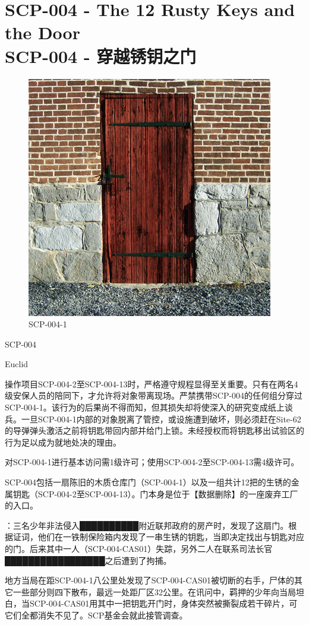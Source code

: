 \chapter[SCP-004 穿越锈钥之门]{
	SCP-004 - The 12 Rusty Keys and the Door\\
	SCP-004 - 穿越锈钥之门
}

\label{chap:SCP-004}

\begin{figure}[H]
	\centering
	\includegraphics[width=0.5\linewidth]{images/SCP.004.jpg}
	\caption*{SCP-004-1}
\end{figure}

SCP-004

Euclid

操作项目SCP-004-2至SCP-004-13时，严格遵守规程显得至关重要。只有在两名4级安保人员的陪同下，才允许将对象带离现场。严禁携带SCP-004的任何组分穿过SCP-004-1。该行为的后果尚不得而知，但其损失却将使深入的研究变成纸上谈兵。一旦SCP-004-1内部的对象脱离了管控，或设施遭到破坏，则必须赶在Site-62的导弹弹头激活之前将钥匙带回内部并给门上锁。未经授权而将钥匙移出试验区的行为足以成为就地处决的理由。

对SCP-004-1进行基本访问需1级许可；使用SCP-004-2至SCP-004-13需4级许可。

SCP-004包括一扇陈旧的木质仓库门（SCP-004-1）以及一组共计12把的生锈的金属钥匙（SCP-004-2至SCP-004-13）。门本身是位于【数据删除】的一座废弃工厂的入口。


：三名少年非法侵入██████████附近联邦政府的房产时，发现了这扇门。根据证词，他们在一铁制保险箱内发现了一串生锈的钥匙，当即决定找出与钥匙对应的门。后来其中一人（SCP-004-CAS01）失踪，另外二人在联系司法长官█████████████████之后遭到了拘捕。

地方当局在距SCP-004-1八公里处发现了SCP-004-CAS01被切断的右手，尸体的其它一些部分则四下散布，最远一处距厂区32公里。在讯问中，羁押的少年向当局坦白，当SCP-004-CAS01用其中一把钥匙开门时，身体突然被撕裂成若干碎片，可它们全都消失不见了。SCP基金会就此接管调查。

